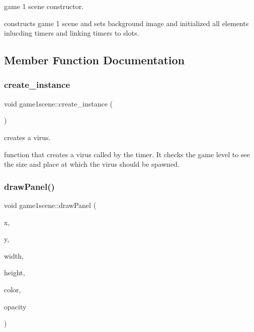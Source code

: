 game 1 scene constructor. 

constructs game 1 scene and sets background image and initialized all elements inlucding timers and linking timers to slots. 

\subsection{Member Function Documentation}
\mbox{\label{classgame1scene_ac85bfe270f65bee86ea75f8a0dafcd39}} 
\subsubsection{\texorpdfstring{create\+\_\+instance}{create\_instance}}
{\footnotesize\ttfamily void game1scene\+::create\+\_\+instance (\begin{DoxyParamCaption}{ }\end{DoxyParamCaption})\hspace{0.3cm}{\ttfamily [slot]}}



creates a virus. 

function that creates a virus called by the timer. It checks the game level to see the size and place at which the virus should be spawned. \mbox{\label{classgame1scene_a730f4e696efa1ea246678e9d2a59a217}} 
\subsubsection{\texorpdfstring{draw\+Panel()}{drawPanel()}}
{\footnotesize\ttfamily void game1scene\+::draw\+Panel (\begin{DoxyParamCaption}\item[{int}]{x,  }\item[{int}]{y,  }\item[{int}]{width,  }\item[{int}]{height,  }\item[{Q\+Color}]{color,  }\item[{double}]{opacity }\end{DoxyParamCaption})}



